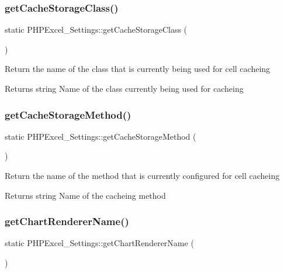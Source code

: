 \subsubsection{\texorpdfstring{get\+Cache\+Storage\+Class()}{getCacheStorageClass()}}
{\footnotesize\ttfamily static P\+H\+P\+Excel\+\_\+\+Settings\+::get\+Cache\+Storage\+Class (\begin{DoxyParamCaption}{ }\end{DoxyParamCaption})\hspace{0.3cm}{\ttfamily [static]}}

Return the name of the class that is currently being used for cell cacheing

\begin{DoxyReturn}{Returns}
string Name of the class currently being used for cacheing 
\end{DoxyReturn}
\mbox{\label{classPHPExcel__Settings_afdb3b6308a8f526526dad82b7c7d9b8e}} 
\subsubsection{\texorpdfstring{get\+Cache\+Storage\+Method()}{getCacheStorageMethod()}}
{\footnotesize\ttfamily static P\+H\+P\+Excel\+\_\+\+Settings\+::get\+Cache\+Storage\+Method (\begin{DoxyParamCaption}{ }\end{DoxyParamCaption})\hspace{0.3cm}{\ttfamily [static]}}

Return the name of the method that is currently configured for cell cacheing

\begin{DoxyReturn}{Returns}
string Name of the cacheing method 
\end{DoxyReturn}
\mbox{\label{classPHPExcel__Settings_ae3f965881b9af1fe436fb6dda751474f}} 
\subsubsection{\texorpdfstring{get\+Chart\+Renderer\+Name()}{getChartRendererName()}}
{\footnotesize\ttfamily static P\+H\+P\+Excel\+\_\+\+Settings\+::get\+Chart\+Renderer\+Name (\begin{DoxyParamCaption}{ }\end{DoxyParamCaption})\hspace{0.3cm}{\ttfamily [static]}}

